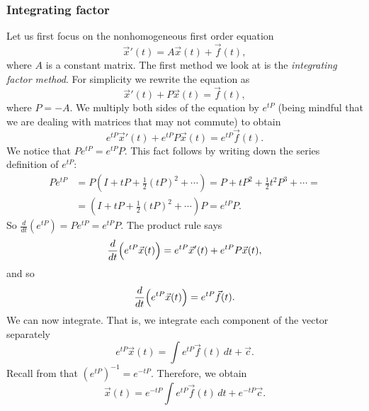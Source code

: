 \subsubsection{Integrating factor}

Let us first focus on the nonhomogeneous first order equation
\begin{equation*}
{\vec{x}}'(t) = A\vec{x}(t) + \vec{f}(t) ,
\end{equation*}
where $A$ is a constant matrix.  The first method we look at is the
\emph{integrating factor method}.
For simplicity we rewrite the equation as
\begin{equation*}
{\vec{x}}'(t) + P \vec{x}(t) = \vec{f}(t) ,
\end{equation*}
where $P = -A$.
We multiply both sides of the
equation by $e^{tP}$ (being mindful that we are dealing with matrices that
may not commute) to obtain
\begin{equation*}
e^{tP}{\vec{x}}'(t) + e^{tP}P\vec{x}(t) = e^{tP}\vec{f}(t) .
\end{equation*}
We notice that $P e^{tP} = e^{tP} P$.  This fact follows by writing
down the series definition of $e^{tP}$:
\begin{equation*}
\begin{split}
P e^{tP} & = 
P \left(
I + tP + \frac{1}{2} {(tP)}^2 + \cdots \right)
=
P + tP^2 + \frac{1}{2} t^2P^3 + \cdots
=
\\
& =
\left(
I + tP + \frac{1}{2} {(tP)}^2 + \cdots \right) P 
= e^{tP} P . 
\end{split}
\end{equation*}
So $\frac{d}{dt} \left( e^{tP} \right) = P e^{tP} = e^{tP} P$.  The product
rule says
\begin{equation*}
\frac{d}{dt}
\Bigl( e^{tP} \vec{x}(t) \Bigr) =
e^{tP}{\vec{x}}'(t) + e^{tP}P\vec{x}(t),
\end{equation*}
and so
\begin{equation*}
\frac{d}{dt}
\Bigl( e^{tP} \vec{x}(t) \Bigr) = e^{tP}\vec{f}(t) .
\end{equation*}
We can now integrate.  That is, we integrate each component of the vector
separately
\begin{equation*}
e^{tP} \vec{x}(t) = \int e^{tP}\vec{f}(t) \, dt + \vec{c} .
\end{equation*}
Recall from  that ${(e^{tP})}^{-1} = e^{-tP}$.
Therefore, we obtain
\begin{equation*}
\vec{x}(t) = e^{-tP} \int e^{tP}\vec{f}(t) \, dt + e^{-tP} \vec{c} .
\end{equation*}

